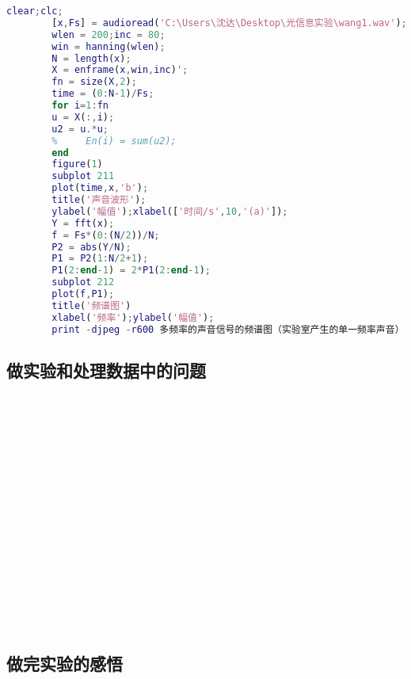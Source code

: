 \documentclass{zjureport}
\begin{document}
\begin{clause}
    	\begin{lstlisting}[language=MATLAB]
    	clear;clc;
    	[x,Fs] = audioread('C:\Users\沈达\Desktop\光信息实验\wang1.wav');
    	wlen = 200;inc = 80;
    	win = hanning(wlen);
    	N = length(x);
    	X = enframe(x,win,inc)';
    	fn = size(X,2);
    	time = (0:N-1)/Fs;
    	for i=1:fn
    	u = X(:,i);
    	u2 = u.*u;
    	%     En(i) = sum(u2);
    	end
    	figure(1)
    	subplot 211
    	plot(time,x,'b');
    	title('声音波形');
    	ylabel('幅值');xlabel(['时间/s',10,'(a)']);
    	Y = fft(x);
    	f = Fs*(0:(N/2))/N;
    	P2 = abs(Y/N);
    	P1 = P2(1:N/2+1);
    	P1(2:end-1) = 2*P1(2:end-1);
    	subplot 212
    	plot(f,P1);
    	title('频谱图')
    	xlabel('频率');ylabel('幅值');
    	print -djpeg -r600 多频率的声音信号的频谱图（实验室产生的单一频率声音）
    	\end{lstlisting}
    	
    
    	
    \end{clause}
  \subsection{做实验和处理数据中的问题}
  	~\\
  ~\\
  ~\\
  ~\\
  ~\\
  ~\\
  ~\\
  ~\\
  ~\\
  ~\\
  ~\\
  ~\\
  ~\\
  ~\\
  ~\\
  \subsection{做完实验的感悟}
  	~\\
  ~\\
  ~\\
  ~\\
  ~\\
  ~\\
  ~\\
  ~\\
  ~\\
  ~\\
  ~\\
  ~\\
  ~\\
  ~\\
  ~\\
\end{document}
